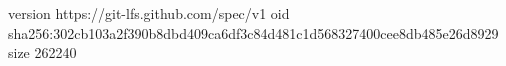 version https://git-lfs.github.com/spec/v1
oid sha256:302cb103a2f390b8dbd409ca6df3c84d481c1d568327400cee8db485e26d8929
size 262240
